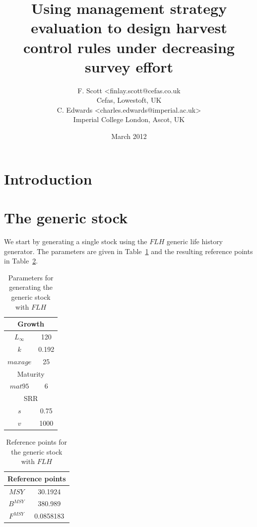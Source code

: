 \documentclass[a4paper]{article}
\begin{document}
\title{Using management strategy evaluation to design harvest control rules under decreasing survey effort}
\author{F. Scott <finlay.scott@cefas.co.uk\\
Cefas, Lowestoft, UK\\
C. Edwards <charles.edwards@imperial.ac.uk>\\
Imperial College London, Ascot, UK}
\date{March 2012}
\maketitle



\section{Introduction}

\section{The generic stock}

We start by generating a single stock using the $FLH$ generic life history generator. 
The parameters are given in Table~\ref{tab:genericStockParams} and the resulting reference points in Table~\ref{tab:genericRefPoints}.


\begin{table}
\centering
\begin{tabular}{|c|c|}
\hline
\multicolumn{2}{|c|}{Growth}\\
\hline
$L_{\infty}$ & 120     \\
$k$          & 0.192        \\
$maxage$     & 25\\
\hline
\multicolumn{2}{|c|}{Maturity}\\
\hline
$mat95$      & 6\\
\hline
\multicolumn{2}{|c|}{SRR}\\
\hline
$s$         & 0.75\\
$v$         & 1000\\
\hline
\end{tabular}
\caption{Parameters for generating the generic stock with $FLH$}
\label{tab:genericStockParams}
\end{table}

\begin{table}
\centering
\begin{tabular}{|c|c|}
\hline
\multicolumn{2}{|c|}{Reference points}\\
\hline
$MSY$       & 30.1924\\
$B^{MSY}$   & 380.989\\
$F^{MSY}$   & 0.0858183\\
\hline
\end{tabular}
\caption{Reference points for the generic stock with $FLH$}
\label{tab:genericRefPoints}
\end{table}
\end{document}
